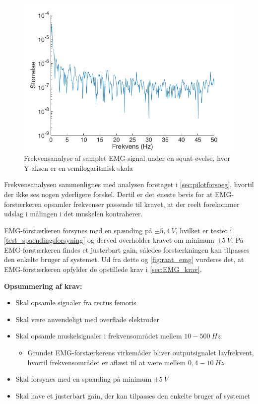 \begin{figure}[H]
\centering
\includegraphics[width=1\textwidth]{figures/fft_raat_EMG}
\caption{Frekvensanalyse af samplet EMG-signal under en squat-øvelse, hvor Y-aksen er en semilogaritmisk skala}
\label{fig:fft_raat_emg}
\end{figure}

\noindent
Frekvensanalysen sammenlignes med analysen foretaget i \autoref{sec:pilotforsoeg}, hvortil der ikke ses nogen yderligere forskel. Dertil er det eneste bevis for at EMG-forstærkeren opsamler frekvenser passende til kravet, at der reelt forekommer udslag i målingen i det muskelen kontraherer.    
 
EMG-forstærkeren forsynes med en spænding på $\pm 5,4~V$, hvilket er testet i \autoref{test_spaendingsforsyning} og derved overholder kravet om minimum $\pm 5~V$.
På EMG-forstærkeren findes et justerbart gain, således forstærkningen kan tilpasses den enkelte bruger af systemet. Ud fra dette og \autoref{fig:raat_emg} vurderes det, at EMG-forstærkeren opfylder de opstillede krav i \autoref{sec:EMG_krav}.

\vspace{3mm}
\textbf{Opsummering af krav:}
\begin{itemize}
\item[\text{\sffamily \checkmark}] Skal opsamle signaler fra rectus femoris
\item[\text{\sffamily \checkmark}] Skal være anvendeligt med overflade elektroder
\item Skal opsamle muskelsignaler i frekvensområdet mellem $10-500~Hz$
\begin{itemize}
\item[\text{\sffamily \checkmark}]Grundet EMG-forstærkerens virkemåder bliver outputsignalet lavfrekvent, hvortil frekvensområdet er aflæst til at være mellem $0,4-10~Hz$
\end{itemize}
\item[\text{\sffamily \checkmark}] Skal forsynes med en spænding på minimum $\pm5~V$
\item[\text{\sffamily \checkmark}] Skal have et justerbart gain, der kan tilpasses den enkelte bruger af systemet
\end{itemize}



